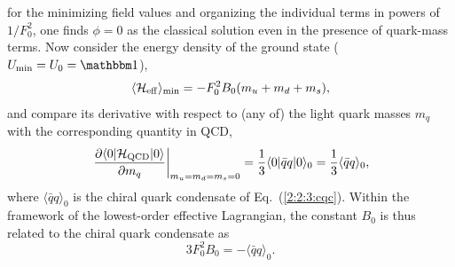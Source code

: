 \documentclass[twoside,12pt]{article}
\begin{document}
for the minimizing field values and organizing the individual terms in
powers of $1/F_0^2$, one finds $\phi=0$ as the classical solution even
in the presence of quark-mass terms.
   Now consider the energy density of the ground state ($U_{\rm min}=U_0={\mathbbm 1}$),
\begin{equation}
\label{2:2:3:Heff}
\langle{\cal H}_{\rm eff}\rangle_{\rm min}=-F_0^2 B_0(m_u+m_d+m_s),
\end{equation}
   and compare its derivative with respect to (any of) the light quark masses
$m_q$ with the corresponding quantity in QCD,
\begin{displaymath}
\left.\frac{\partial \langle 0|{\cal H}_{\rm QCD}|0\rangle}{\partial m_q}
\right|_{m_u=m_d=m_s=0}=\frac{1}{3}\langle 0|\bar{q}{q}|0\rangle_0
=\frac{1}{3}\langle \bar{q}q\rangle_0,
\end{displaymath}
   where $\langle\bar{q}{q}\rangle_0$ is the chiral quark condensate of
Eq.\ (\ref{2:2:3:cqc}).
   Within the framework of the lowest-order effective
Lagrangian, the constant $B_0$ is thus related to the chiral quark condensate
as
\begin{equation}
\label{3:2:2:b0}
3 F^2_0B_0=-\langle\bar{q}q\rangle_0.
\end{equation}
\end{document}
